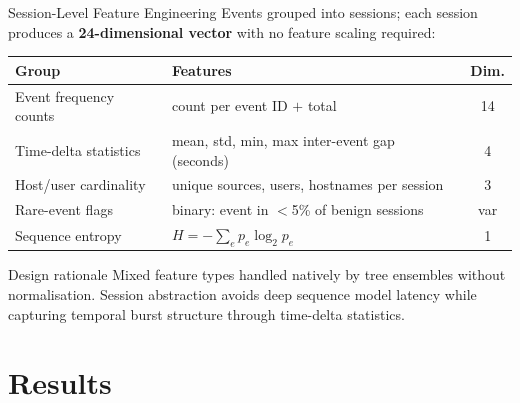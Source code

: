 \documentclass[aspectratio=169]{beamer}
\begin{document}
\begin{frame}{Session-Level Feature Engineering}
  Events grouped into sessions; each session produces a \textbf{24-dimensional vector}
  with no feature scaling required:

  \vspace{0.4em}
  \begin{table}
    \centering
    \begin{tabular}{llc}
      \toprule
      Group & Features & Dim. \\
      \midrule
      Event frequency counts  & count per event ID $+$ total                  & 14 \\
      Time-delta statistics   & mean, std, min, max inter-event gap (seconds) &  4 \\
      Host/user cardinality   & unique sources, users, hostnames per session   &  3 \\
      Rare-event flags        & binary: event in $<$5\% of benign sessions     & var \\
      Sequence entropy        & $H = -\sum_e p_e \log_2 p_e$                  &  1 \\
      \bottomrule
    \end{tabular}
  \end{table}

  \vspace{0.4em}
  \begin{block}{Design rationale}
    Mixed feature types handled natively by tree ensembles without normalisation.
    Session abstraction avoids deep sequence model latency while capturing temporal
    burst structure through time-delta statistics.
  \end{block}
\end{frame}

\section{Results}
\end{document}
